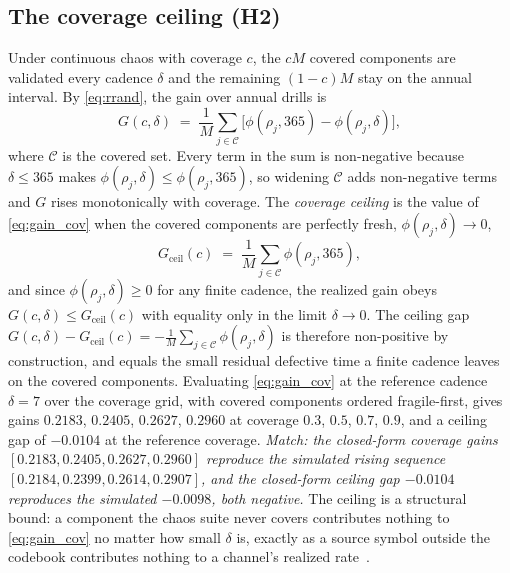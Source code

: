 \documentclass[journal]{IEEEtran}
\begin{document}
\subsection{The coverage ceiling (H2)}
Under continuous chaos with coverage $c$, the $cM$ covered components are validated every cadence
$\delta$ and the remaining $(1-c)M$ stay on the annual interval. By \eqref{eq:rrand}, the gain over
annual drills is
\begin{equation}
\label{eq:gain_cov}
G(c, \delta) \;=\; \frac{1}{M}\!\sum_{j \in \mathcal{C}} \big[\phi(\rho_j, 365) - \phi(\rho_j, \delta)\big],
\end{equation}
where $\mathcal{C}$ is the covered set. Every term in the sum is non-negative because $\delta \le 365$
makes $\phi(\rho_j, \delta) \le \phi(\rho_j, 365)$, so widening $\mathcal{C}$ adds non-negative terms
and $G$ rises monotonically with coverage. The \emph{coverage ceiling} is the value of \eqref{eq:gain_cov}
when the covered components are perfectly fresh, $\phi(\rho_j, \delta) \to 0$,
\begin{equation}
\label{eq:ceiling}
G_{\mathrm{ceil}}(c) \;=\; \frac{1}{M}\!\sum_{j \in \mathcal{C}} \phi(\rho_j, 365),
\end{equation}
and since $\phi(\rho_j, \delta) \ge 0$ for any finite cadence, the realized gain obeys
$G(c, \delta) \le G_{\mathrm{ceil}}(c)$ with equality only in the limit $\delta \to 0$. The ceiling
gap $G(c, \delta) - G_{\mathrm{ceil}}(c) = -\frac{1}{M}\sum_{j \in \mathcal{C}} \phi(\rho_j, \delta)$
is therefore non-positive by construction, and equals the small residual defective time a finite
cadence leaves on the covered components. Evaluating \eqref{eq:gain_cov} at the reference cadence
$\delta = 7$ over the coverage grid, with covered components ordered fragile-first, gives gains
$0.2183$, $0.2405$, $0.2627$, $0.2960$ at coverage $0.3$, $0.5$, $0.7$, $0.9$, and a ceiling gap of
$-0.0104$ at the reference coverage. \emph{Match: the closed-form coverage gains $[0.2183, 0.2405,
0.2627, 0.2960]$ reproduce the simulated rising sequence $[0.2184, 0.2399, 0.2614, 0.2907]$, and the
closed-form ceiling gap $-0.0104$ reproduces the simulated $-0.0098$, both negative.} The ceiling is a
structural bound: a component the chaos suite never covers contributes nothing to \eqref{eq:gain_cov}
no matter how small $\delta$ is, exactly as a source symbol outside the codebook contributes nothing
to a channel's realized rate~\cite{cover2006elements}.
\end{document}
